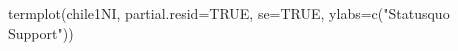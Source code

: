 \begin{Schunk}
\begin{Sinput}
 termplot(chile1NI, partial.resid=TRUE, se=TRUE, ylabs=c("Statusquo Support"))
\end{Sinput}
\end{Schunk}
